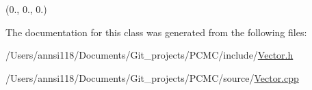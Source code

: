 (0., 0., 0.) 



The documentation for this class was generated from the following files\+:\begin{DoxyCompactItemize}
\item 
/\+Users/annsi118/\+Documents/\+Git\+\_\+projects/\+P\+C\+M\+C/include/\hyperlink{_vector_8h}{Vector.\+h}\item 
/\+Users/annsi118/\+Documents/\+Git\+\_\+projects/\+P\+C\+M\+C/source/\hyperlink{_vector_8cpp}{Vector.\+cpp}\end{DoxyCompactItemize}
